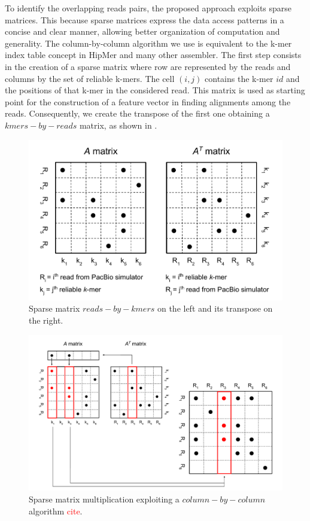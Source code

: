 \documentclass[11pt]{article}
\newcommand\myworries[1]{\textcolor{red}{#1}}
\begin{document}
To identify the overlapping reads pairs, the proposed approach exploits sparse matrices.
This because sparse matrices express the data access patterns in a concise and clear manner, allowing better organization of computation and generality.
The column-by-column algorithm we use is equivalent to the k-mer index table concept in HipMer and many other assembler. 
The first step consists in the creation of a sparse matrix where row are represented by the reads and columns by the set of reliable k-mers.
The cell $(i,j)$ contains the k-mer $id$ and the positions of that k-mer in the considered read.
This matrix is used as starting point for the construction of a feature vector in finding alignments among the reads.
Consequently, we create the transpose of the first one obtaining a $kmers-by-reads$ matrix, as shown in .
\begin{figure}
    \centering
    \includegraphics[width=\textwidth]{image/matrices.pdf}
    \caption{Sparse matrix $reads-by-kmers$ on the left and its transpose on the right.}
    \label{fig:matrices}
\end{figure}
\begin{figure}
    \centering
    \includegraphics[width=\textwidth]{image/mult.pdf}
    \caption{Sparse matrix multiplication exploiting a $column-by-column$ algorithm \myworries{cite}.}
    \label{fig:mult}
\end{figure}
\end{document}
